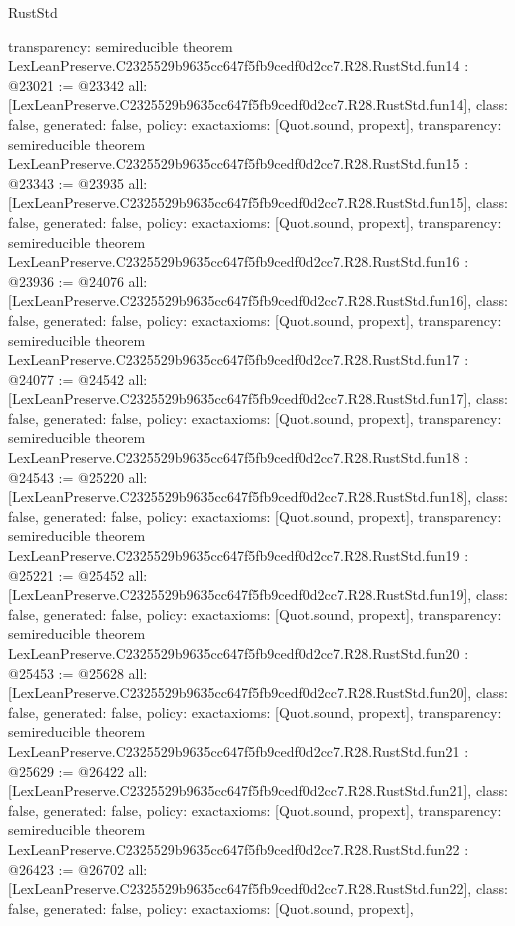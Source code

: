 \begin{lexlean}{RustStd}
\begin{coremodule}
{  transparency: semireducible
}
theorem LexLeanPreserve.C2325529b9635cc647f5fb9cedf0d2cc7.R28.RustStd.fun14 : @23021 := @23342 {
  all: [LexLeanPreserve.C2325529b9635cc647f5fb9cedf0d2cc7.R28.RustStd.fun14],
  class: false,
  generated: false,
  policy: exact{axioms: [Quot.sound, propext]},
  transparency: semireducible
}
theorem LexLeanPreserve.C2325529b9635cc647f5fb9cedf0d2cc7.R28.RustStd.fun15 : @23343 := @23935 {
  all: [LexLeanPreserve.C2325529b9635cc647f5fb9cedf0d2cc7.R28.RustStd.fun15],
  class: false,
  generated: false,
  policy: exact{axioms: [Quot.sound, propext]},
  transparency: semireducible
}
theorem LexLeanPreserve.C2325529b9635cc647f5fb9cedf0d2cc7.R28.RustStd.fun16 : @23936 := @24076 {
  all: [LexLeanPreserve.C2325529b9635cc647f5fb9cedf0d2cc7.R28.RustStd.fun16],
  class: false,
  generated: false,
  policy: exact{axioms: [Quot.sound, propext]},
  transparency: semireducible
}
theorem LexLeanPreserve.C2325529b9635cc647f5fb9cedf0d2cc7.R28.RustStd.fun17 : @24077 := @24542 {
  all: [LexLeanPreserve.C2325529b9635cc647f5fb9cedf0d2cc7.R28.RustStd.fun17],
  class: false,
  generated: false,
  policy: exact{axioms: [Quot.sound, propext]},
  transparency: semireducible
}
theorem LexLeanPreserve.C2325529b9635cc647f5fb9cedf0d2cc7.R28.RustStd.fun18 : @24543 := @25220 {
  all: [LexLeanPreserve.C2325529b9635cc647f5fb9cedf0d2cc7.R28.RustStd.fun18],
  class: false,
  generated: false,
  policy: exact{axioms: [Quot.sound, propext]},
  transparency: semireducible
}
theorem LexLeanPreserve.C2325529b9635cc647f5fb9cedf0d2cc7.R28.RustStd.fun19 : @25221 := @25452 {
  all: [LexLeanPreserve.C2325529b9635cc647f5fb9cedf0d2cc7.R28.RustStd.fun19],
  class: false,
  generated: false,
  policy: exact{axioms: [Quot.sound, propext]},
  transparency: semireducible
}
theorem LexLeanPreserve.C2325529b9635cc647f5fb9cedf0d2cc7.R28.RustStd.fun20 : @25453 := @25628 {
  all: [LexLeanPreserve.C2325529b9635cc647f5fb9cedf0d2cc7.R28.RustStd.fun20],
  class: false,
  generated: false,
  policy: exact{axioms: [Quot.sound, propext]},
  transparency: semireducible
}
theorem LexLeanPreserve.C2325529b9635cc647f5fb9cedf0d2cc7.R28.RustStd.fun21 : @25629 := @26422 {
  all: [LexLeanPreserve.C2325529b9635cc647f5fb9cedf0d2cc7.R28.RustStd.fun21],
  class: false,
  generated: false,
  policy: exact{axioms: [Quot.sound, propext]},
  transparency: semireducible
}
theorem LexLeanPreserve.C2325529b9635cc647f5fb9cedf0d2cc7.R28.RustStd.fun22 : @26423 := @26702 {
  all: [LexLeanPreserve.C2325529b9635cc647f5fb9cedf0d2cc7.R28.RustStd.fun22],
  class: false,
  generated: false,
  policy: exact{axioms: [Quot.sound, propext]},
}
\end{coremodule}
\end{lexlean}
